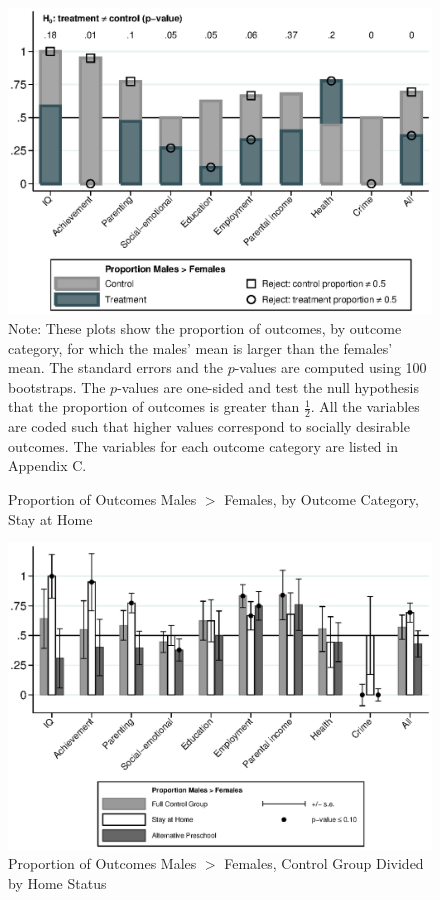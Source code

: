 \begin{figure}
\centering
\caption{Proportion of Outcomes Males $>$ Females, by Outcome Category, Stay at Home}
\label{fig:proportion-home}
	\includegraphics[width=\textwidth]{output/gendergaps-treat-vs-home}
\footnotesize \justify
Note: These plots show the proportion of outcomes, by outcome category, for which the males' mean is larger than the females' mean. The standard errors and the $p$-values are computed using 100 bootstraps. The $p$-values are one-sided and test the null hypothesis that the proportion of outcomes is greater than $\frac{1}{2}$. All the variables are coded such that higher values correspond to socially desirable outcomes. The variables for each outcome category are listed in Appendix C.
\end{figure}

\begin{figure}
\centering
\caption{Proportion of Outcomes Males $>$ Females, Control Group Divided by Home Status}\label{fig3}
\includegraphics[width=\textwidth]{output/gendergaps-control-moderated-altpre}
\end{figure}

